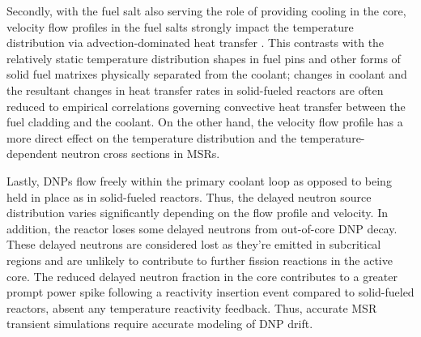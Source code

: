 Secondly, with the fuel
salt also serving the role of providing cooling in the core, velocity flow
profiles in the fuel salts strongly impact the temperature distribution via
advection-dominated heat transfer \cite{diamond_phenomena_2018}. This contrasts
with the relatively static temperature distribution shapes in fuel pins and
other forms of solid fuel matrixes physically separated from the coolant; 
changes in coolant and the resultant changes in heat transfer rates in
solid-fueled reactors are often reduced to empirical correlations governing
convective heat transfer between the fuel cladding and the coolant. On the
other hand, the velocity flow profile has a more direct effect on the
temperature distribution and the temperature-dependent neutron cross sections
in \glspl{MSR}.

Lastly, \glspl{DNP} flow freely within the primary coolant loop as opposed to
being held in place as in solid-fueled reactors. Thus, the delayed neutron
source distribution varies significantly depending on the flow profile and
velocity. In addition, the reactor loses some delayed neutrons from out-of-core
\gls{DNP} decay. These delayed neutrons are considered lost as they're emitted
in subcritical regions and are unlikely to contribute to further fission
reactions in the active core. The reduced delayed neutron fraction in the core
contributes to a greater prompt power spike following a reactivity insertion
event compared to solid-fueled reactors, absent any temperature reactivity
feedback. Thus, accurate \gls{MSR} transient simulations require accurate
modeling of \gls{DNP} drift.

